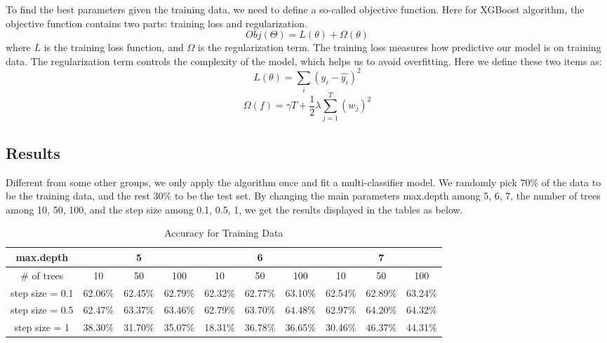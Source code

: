\documentclass{article}
\begin{document}
\begin{spacing}{1}
\begin{large}
\noindent \indent To find the best parameters given the training data, we need to define a so-called objective function. Here for XGBoost algorithm, the objective function contains two parts: training loss and regularization.
\[
Obj(\Theta) = L(\theta) + \Omega(\theta)
\]
where $L$ is the training loss function, and $\Omega$ is the regularization term. The training loss measures how predictive our model is on training data. The regularization term controls the complexity of the model, which helps us to avoid overfitting. Here we define these two items as:
\[
L(\theta) = \sum_{i}(y_i - \hat{y_i})^2
\]
\[
\Omega(f) = \gamma T + \frac{1}{2}\lambda\sum_{j = 1}^{T}(w_j)^2
\]
 



\subsection{Results}

\noindent \indent Different from some other groups, we only apply the algorithm once and fit a multi-classifier model. We randomly pick 70\% of the data to be the training data, and the rest 30\% to be the test set. By changing the main parameters \cite{xg3} max.depth among 5, 6, 7, the number of trees among 10, 50, 100, and the step size among 0.1, 0.5, 1, we get the results displayed in the tables as below.
\begin{table}[h]
\centering
\caption{Accuracy for Training Data}
\label{Accuracy for Training Data}
\begin{tabular}{cccccccccc}
\hline
max.depth       & \multicolumn{3}{c}{5} & \multicolumn{3}{c}{6} & \multicolumn{3}{c}{7} \\ \hline
\# of trees     & 10    & 50    & 100   & 10  & 50       & 100  & 10    & 50    & 100   \\
step size = 0.1 & 62.06\%    & 62.45\%     & 62.79\%     & 62.32\%    & 62.77\%         & 63.10\%      & 62.54\%     & 62.89\%      & 63.24\%      \\
step size = 0.5 & 62.47\%    & 63.37\%       & 63.46\%      & 62.79\%   & 63.70\%  & 64.48\%     & 62.97\%       & 64.20\%      & 64.32\%      \\
step size = 1   &38.30\%       & 31.70\%      &35.07\%       &18.31\%     & 36.78\%         &36.65\%      &30.46\%       &46.37\%       &44.31\%       \\ \hline
\end{tabular}
\end{table}


\end{large}
\end{spacing}
\end{document}
